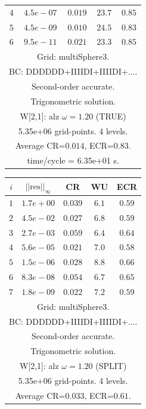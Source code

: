 \begin{table}[hbt]
\begin{center}
{\begin{tabular}{|c|c|c|c|c|}
 $ 4$  & $ 4.5e-07$ & $0.019$ & $23.7$ & $0.85$ \\ 
 $ 5$  & $ 4.5e-09$ & $0.010$ & $24.5$ & $0.83$ \\ 
 $ 6$  & $ 9.5e-11$ & $0.021$ & $23.3$ & $0.85$ \\ 
\hline 
\multicolumn{5}{|c|}{Grid: multiSphere3.}  \\
\multicolumn{5}{|c|}{BC: DDDDDD+IIIIDI+IIIIDI+....}  \\
\multicolumn{5}{|c|}{Second-order accurate.}  \\
\multicolumn{5}{|c|}{Trigonometric solution.}  \\
\multicolumn{5}{|c|}{W[2,1]: alz $\omega=1.20$ (TRUE)}  \\
\multicolumn{5}{|c|}{5.35e+06 grid-points. 4 levels.}  \\
\multicolumn{5}{|c|}{Average CR=$0.014$, ECR=$0.83$.}  \\
\multicolumn{5}{|c|}{time/cycle = 6.35e+01 s.}  \\
\hline 
\end{tabular}
\begin{tabular}{|c|c|c|c|c|} \hline 
 $i$   & $\vert\vert\mbox{res}\vert\vert_\infty$  &  CR     &  WU    & ECR  \\   \hline 
 $ 1$  & $ 1.7e+00$ & $0.039$ & $ 6.1$ & $0.59$ \\ 
 $ 2$  & $ 4.5e-02$ & $0.027$ & $ 6.8$ & $0.59$ \\ 
 $ 3$  & $ 2.7e-03$ & $0.059$ & $ 6.4$ & $0.64$ \\ 
 $ 4$  & $ 5.6e-05$ & $0.021$ & $ 7.0$ & $0.58$ \\ 
 $ 5$  & $ 1.5e-06$ & $0.028$ & $ 8.8$ & $0.66$ \\ 
 $ 6$  & $ 8.3e-08$ & $0.054$ & $ 6.7$ & $0.65$ \\ 
 $ 7$  & $ 1.8e-09$ & $0.022$ & $ 7.2$ & $0.59$ \\ 
\hline 
\multicolumn{5}{|c|}{Grid: multiSphere3.}  \\
\multicolumn{5}{|c|}{BC: DDDDDD+IIIIDI+IIIIDI+....}  \\
\multicolumn{5}{|c|}{Second-order accurate.}  \\
\multicolumn{5}{|c|}{Trigonometric solution.}  \\
\multicolumn{5}{|c|}{W[2,1]: alz $\omega=1.20$ (SPLIT)}  \\
\multicolumn{5}{|c|}{5.35e+06 grid-points. 4 levels.}  \\
\multicolumn{5}{|c|}{Average CR=$0.033$, ECR=$0.61$.}  \\

\end{tabular}}
\end{center}
\end{table}
